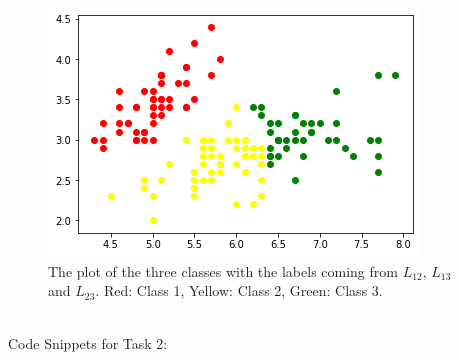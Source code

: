 \begin{figure}
	\centering
	\includegraphics{Figure_2b_LDA.png}
	\caption{The plot of the three classes with the labels coming from $L_{12}$, $L_{13}$ and $L_{23}$. Red: Class 1, Yellow: Class 2, Green: Class 3.}
	\label{fig:2b-Plot2}
\end{figure} 
\\
Code Snippets for Task 2:
